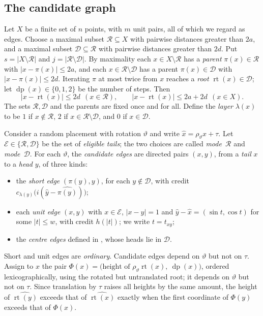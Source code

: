 \documentclass[11pt,colorlinks]{charlie}
\newcommand{\cR}{\mathcal{R}}
\newcommand{\cD}{\mathcal{D}}
\newcommand{\cE}{\mathcal{E}}
\begin{document}
\subsection{The candidate graph}\label{sec:forest-def}
Let $X$ be a finite set of $n$ points, with $m$ unit pairs, all of which we regard as edges. Choose a maximal subset $\cR\subseteq X$ with pairwise distances greater than $2a$, and a maximal subset $\cD\subseteq\cR$ with pairwise distances greater than $2d$. Put $s=|X\setminus\cR|$ and $j=|\cR\setminus\cD|$. By maximality each $x\in X\setminus\cR$ has a \emph{parent} $\pi(x)\in\cR$ with $|x-\pi(x)|\le2a$, and each $x\in\cR\setminus\cD$ has a parent $\pi(x)\in\cD$ with $|x-\pi(x)|\le2d$. Iterating $\pi$ at most twice from $x$ reaches a \emph{root} $\operatorname{rt}(x)\in\cD$; let $\operatorname{dp}(x)\in\{0,1,2\}$ be the number of steps. Then
\begin{equation}\label{eq:rootdist}
 |x-\operatorname{rt}(x)|\le2d\ \ (x\in\cR),\qquad |x-\operatorname{rt}(x)|\le2a+2d\ \ (x\in X).
\end{equation}
The sets $\cR,\cD$ and the parents are fixed once and for all. Define the \emph{layer} $\lambda(x)$ to be $1$ if $x\notin\cR$, $2$ if $x\in\cR\setminus\cD$, and $0$ if $x\in\cD$.

Consider a random placement with rotation $\vartheta$ and write $\hat x=\rho_\vartheta x+\tau$. Let $\cE\in\{\cR,\cD\}$ be the set of \emph{eligible tails}; the two choices are called \emph{mode~$\cR$} and \emph{mode~$\cD$}. For each $\vartheta$, the \emph{candidate edges} are directed pairs $(x,y)$, from a \emph{tail} $x$ to a \emph{head} $y$, of three kinds:
\begin{itemize}
\item the \emph{short edge} $(\pi(y),y)$, for each $y\notin\cD$, with credit $c_{\lambda(y)}\big(i(\hat y-\widehat{\pi(y)})\big)$;
\item each \emph{unit edge} $(x,y)$ with $x\in\cE$, $|x-y|=1$ and $\hat y-\hat x=(\sin t,\cos t)$ for some $|t|\le w$, with credit $h(|t|)$; we write $t=t_{xy}$;
\item the \emph{centre edges} defined in , whose heads lie in $\cD$.
\end{itemize}
Short and unit edges are \emph{ordinary}. Candidate edges depend on $\vartheta$ but not on $\tau$. Assign to $x$ the pair $\Phi(x)=\big(\text{height of }\rho_\vartheta\operatorname{rt}(x),\ \operatorname{dp}(x)\big)$, ordered lexicographically, using the rotated but untranslated root; it depends on $\vartheta$ but not on $\tau$. Since translation by $\tau$ raises all heights by the same amount, the height of $\widehat{\operatorname{rt}(y)}$ exceeds that of $\widehat{\operatorname{rt}(x)}$ exactly when the first coordinate of $\Phi(y)$ exceeds that of $\Phi(x)$.
\end{document}
